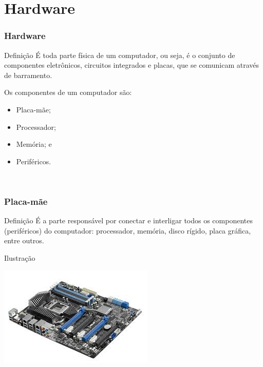 \documentclass[aspectratio=169]{beamer} %
\begin{document}
\section{Hardware}

\begin{frame}
	\frametitle{Hardware}
	
	\begin{block}{Defini\c cão}
		É toda parte física de um computador, ou seja, é o conjunto de componentes eletrônicos, circuitos integrados e placas, que se comunicam através de barramento.
	\end{block}\vfill
	
	Os componentes de um computador são:
	\begin{itemize}
		\item Placa-mãe;
		\item Processador;
		\item Memória; e
		\item Periféricos.
	\end{itemize}\
\end{frame}

\begin{frame}
	\frametitle{Placa-mãe}
	
	\begin{block}{Defini\c cão}
		É a parte responsável por conectar e interligar todos os componentes (periféricos) do computador: processador, memória, disco rígido, placa gráfica, entre outros.
	\end{block}\vfill
	
	\begin{exampleblock}{Ilustra\c cão}
		\begin{center}
			\includegraphics[scale=0.4]{img/placa-mae}
		\end{center}			
	\end{exampleblock}
\end{frame}
\end{document}
